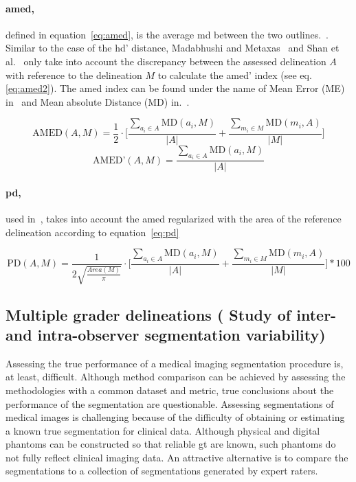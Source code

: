 \paragraph{\acf{amed},} defined in equation~\ref{eq:amed}, is the average \ac{md} between the two outlines.~\cite{Gao:2012p14336}. Similar to the case of the \ac{hd}' distance, Madabhushi and Metaxas~\cite{Madabhushi:2003p6036} and Shan et al.~\cite{Shan:2012p14347} only take into account the discrepancy between the assessed delineation $A$ with reference to the delineation $M$ to calculate the \ac{amed}' index (see eq.\,\ref{eq:amed2}). The \ac{amed} index can be found under the name of Mean Error (ME) in~\cite{Madabhushi:2003p6036} and Mean absolute Distance (MD) in.~\cite{Shan:2012p14347}.

\begin{equation}
\text{AMED} (A,M) = \frac{1}{2}  \cdot  \Bigg [ 
 \frac{ \sum_{a_i \in A} \text{MD}(a_i,M)}{|A|} + \frac{ \sum_{m_i \in M} \text{MD}(m_i,A) }{|M|} \Bigg ]
\label{eq:amed}
\end{equation}
\begin{equation}
\label{eq:amed2}
\text{AMED'} (A,M)= \frac{ \sum_{a_i \in A} \text{MD}(a_i,M)}{|A|}
\end{equation}

\paragraph{\ac{pd},} used in~\cite{AlemanFlores:2007p14310,Gomez:2010p14339}, takes into account the \ac{amed} regularized with the area of the reference delineation according to equation~\ref{eq:pd}

\begin{equation}
\text{PD} (A,M) = \frac{1}{2 \sqrt{\frac{Area(M)}{\pi}}} \cdot  \Bigg [ 
 \frac{ \sum_{a_i \in A} \text{MD}(a_i,M)}{|A|} + \frac{ \sum_{m_i \in M} \text{MD}(m_i,A) }{|M|} \Bigg ] * 100
\label{eq:pd}
\end{equation}

\subsection[Multiple grader delineations ]{Multiple grader delineations ( Study of inter- and intra-observer segmentation variability)}\label{sec:multipleGT}

Assessing the true performance of a medical imaging segmentation procedure is, at least, difficult. Although method comparison can be achieved by assessing the methodologies with a common dataset and metric, true conclusions about the performance of the segmentation are questionable. Assessing segmentations of medical images is challenging because of the difficulty of obtaining or estimating a known true segmentation for clinical data. Although physical and digital phantoms can be constructed so that reliable \ac{gt} are known, such phantoms do not fully reflect clinical imaging data. An attractive alternative is to compare the segmentations to a collection of segmentations generated by expert raters. 

